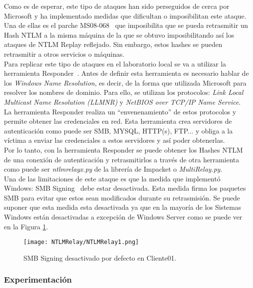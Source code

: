 Como es de esperar, este tipo de ataques han sido perseguidos de cerca por Microsoft y ha implementado medidas que dificultan o imposibilitan este ataque. Una de ellas es el parche MS08-068~\cite{Capitulo5:MS08-068} que imposibilita que se pueda retrasmitir un Hash NTLM a la misma máquina de la que se obtuvo imposibilitando así los ataques de NTLM Replay reflejado. Sin embargo, estos hashes se pueden retrasmitir a otros servicios o máquinas. \\

Para replicar este tipo de ataques en el laboratorio local se va a utilizar la herramienta Responder~\cite{Capitulo5:Responder}. Antes de definir esta herramienta es necesario hablar de los {\it Windows Name Resolution}, es decir, de la forma que utilizada Microsoft para resolver los nombres de dominio. Para ello, se utilizan los protocolos: {\it Link Local Multicast Name Resolution (LLMNR)} y {\it NetBIOS over TCP/IP Name Service}. La herramienta Responder realiza un ``envenenamiento'' de estos protocolos y permite obtener las credenciales en red. Esta herramienta crea servidores de autenticación como puede ser SMB, MYSQL, HTTP(s), FTP... y obliga a la víctima a enviar las credenciales a estos servidores y así poder obtenerlas. \\

Por lo tanto, con la herramienta Responder se puede obtener los Hashes NTLM de una conexión de autenticación y retrasmitirlos a través de otra herramienta como puede ser {\it ntlmrelayx.py} de la librería de Impacket o {\it MultiRelay.py}. \\

Una de las limitaciones de este ataque es que la medida que implementó Windows: SMB Signing~\cite{Capitulo5:SMBSigning} debe estar desactivada. Esta medida firma los paquetes SMB para evitar que estos sean modificados durante su retrasmisión. Se puede suponer que esta medida esta desactivada ya que en la mayoría de los Sistemas Windows están desactivadas a excepción de Windows Server como se puede ver en la Figura \ref{NTLMRelay1}.

\begin{figure}[H] %
\begin{center}
\texttt{[image: NTLMRelay/NTLMRelay1.png]}
\end{center}
\caption{SMB Signing desactivado por defecto en Cliente01.}
\label{NTLMRelay1}
\end{figure}

\subsubsection{Experimentación}


